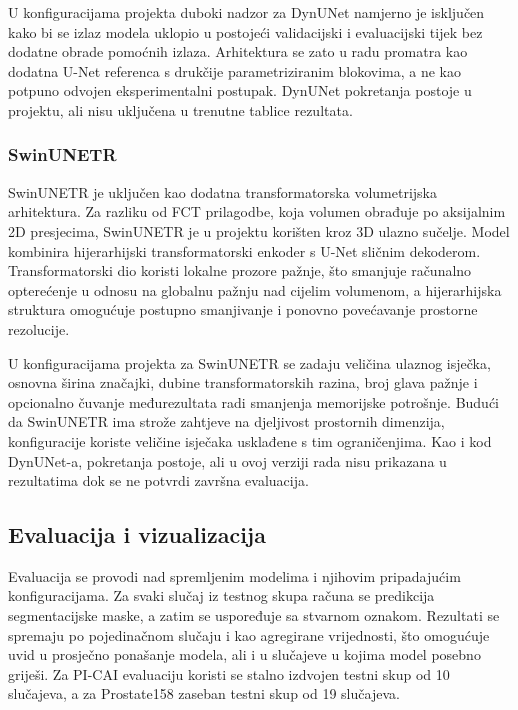 \documentclass[a4paper,12pt,oneside]{article}
\begin{document}
U konfiguracijama projekta duboki nadzor za DynUNet namjerno je isključen kako bi se izlaz modela uklopio u postojeći validacijski i evaluacijski tijek bez dodatne obrade pomoćnih izlaza. Arhitektura se zato u radu promatra kao dodatna U-Net referenca s drukčije parametriziranim blokovima, a ne kao potpuno odvojen eksperimentalni postupak. DynUNet pokretanja postoje u projektu, ali nisu uključena u trenutne tablice rezultata.


\subsubsection{SwinUNETR}

SwinUNETR je uključen kao dodatna transformatorska volumetrijska arhitektura. Za razliku od FCT prilagodbe, koja volumen obrađuje po aksijalnim 2D presjecima, SwinUNETR je u projektu korišten kroz 3D ulazno sučelje. Model kombinira hijerarhijski transformatorski enkoder s U-Net sličnim dekoderom. Transformatorski dio koristi lokalne prozore pažnje, što smanjuje računalno opterećenje u odnosu na globalnu pažnju nad cijelim volumenom, a hijerarhijska struktura omogućuje postupno smanjivanje i ponovno povećavanje prostorne rezolucije.

U konfiguracijama projekta za SwinUNETR se zadaju veličina ulaznog isječka, osnovna širina značajki, dubine transformatorskih razina, broj glava pažnje i opcionalno čuvanje međurezultata radi smanjenja memorijske potrošnje. Budući da SwinUNETR ima strože zahtjeve na djeljivost prostornih dimenzija, konfiguracije koriste veličine isječaka usklađene s tim ograničenjima. Kao i kod DynUNet-a, pokretanja postoje, ali u ovoj verziji rada nisu prikazana u rezultatima dok se ne potvrdi završna evaluacija.


\subsection{Evaluacija i vizualizacija}

Evaluacija se provodi nad spremljenim modelima i njihovim pripadajućim konfiguracijama. Za svaki slučaj iz testnog skupa računa se predikcija segmentacijske maske, a zatim se uspoređuje sa stvarnom oznakom. Rezultati se spremaju po pojedinačnom slučaju i kao agregirane vrijednosti, što omogućuje uvid u prosječno ponašanje modela, ali i u slučajeve u kojima model posebno griješi. Za PI-CAI evaluaciju koristi se stalno izdvojen testni skup od 10 slučajeva, a za Prostate158 zaseban testni skup od 19 slučajeva.
\end{document}
